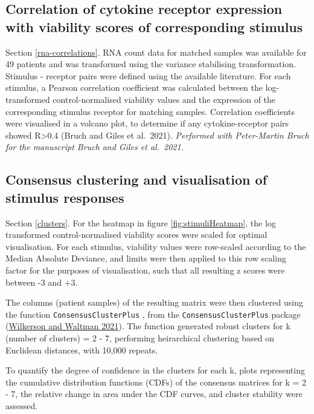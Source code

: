 \documentclass[11pt, a4paper, twosided]{book}
\begin{document}
\hypertarget{correlation-of-cytokine-receptor-expression-with-viability-scores-of-corresponding-stimulus}{%
\subsection{Correlation of cytokine receptor expression with viability scores of corresponding stimulus}\label{correlation-of-cytokine-receptor-expression-with-viability-scores-of-corresponding-stimulus}}

Section \ref{rna-correlations}. RNA count data for matched samples was available for 49 patients and was transformed using the variance stabilising transformation. Stimulus - receptor pairs were defined using the available literature. For each stimulus, a Pearson correlation coefficient was calculated between the log-transformed control-normalised viability values and the expression of the corresponding stimulus receptor for matching samples. Correlation coefficients were visualised in a volcano plot, to determine if any cytokine-receptor pairs showed R\textgreater0.4 (Bruch and Giles et al.~2021). \emph{Performed with Peter-Martin Bruch for the manuscript Bruch and Giles et al.~2021.}

\hypertarget{stimulus-heatmap-method}{%
\subsection{Consensus clustering and visualisation of stimulus responses}\label{stimulus-heatmap-method}}

Section \ref{clusters}. For the heatmap in figure \ref{fig:stimuliHeatmap}, the log transformed control-normalised viability scores were scaled for optimal visualisation. For each stimulus, viability values were row-scaled according to the Median Absolute Deviance, and limits were then applied to this row scaling factor for the purposes of visualisation, such that all resulting z scores were between -3 and +3.

The columns (patient samples) of the resulting matrix were then clustered using the function \texttt{ConsensusClusterPlus} , from the \texttt{ConsensusClusterPlus} package (\protect\hyperlink{ref-R-ConsensusClusterPlus}{Wilkerson and Waltman 2021}). The function generated robust clusters for k (number of clusters) = 2 - 7, performing heirarchical clustering based on Euclidean distances, with 10,000 repeats.

To quantify the degree of confidence in the clusters for each k, plots representing the cumulative distribution functions (CDFs) of the consensus matrices for k = 2 - 7, the relative change in area under the CDF curves, and cluster stability were assessed.
\end{document}
